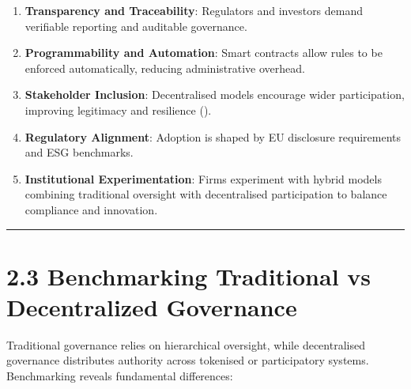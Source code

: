 \documentclass[
  english,
  12pt,
  oneside,
  open=any]{scrbook}
\providecommand{\tightlist}{%
  \setlength{\itemsep}{0pt}\setlength{\parskip}{0pt}}\usepackage{longtable,booktabs,array}
\begin{document}
\begin{enumerate}
\def\labelenumi{\arabic{enumi}.}
\tightlist
\item
  \textbf{Transparency and Traceability}: Regulators and investors
  demand verifiable reporting and auditable governance.\\
\item
  \textbf{Programmability and Automation}: Smart contracts allow rules
  to be enforced automatically, reducing administrative overhead.\\
\item
  \textbf{Stakeholder Inclusion}: Decentralised models encourage wider
  participation, improving legitimacy and resilience
  ().\\
\item
  \textbf{Regulatory Alignment}: Adoption is shaped by EU disclosure
  requirements and ESG benchmarks.\\
\item
  \textbf{Institutional Experimentation}: Firms experiment with hybrid
  models combining traditional oversight with decentralised
  participation to balance compliance and innovation.
\end{enumerate}

\begin{center}\rule{0.5\linewidth}{0.5pt}\end{center}

\section{2.3 Benchmarking Traditional vs Decentralized
Governance}\label{sec-benchmark}

Traditional governance relies on hierarchical oversight, while
decentralised governance distributes authority across tokenised or
participatory systems. Benchmarking reveals fundamental differences:
\end{document}
